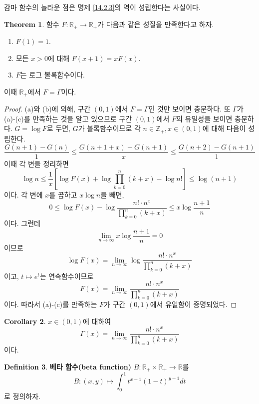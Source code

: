 \documentclass[11pt]{book}
\numberwithin{equation}{chapter}
\def\ZZ{\mathbb{Z}}
\def\RR{\mathbb{R}}
\newcommand{\sqbracket}[1]{\left[#1\right]}
\theoremstyle{definition}
\newtheorem{thm}{Theorem}[section]
\newtheorem{cor}[thm]{Corollary}
\newtheorem{defn}[thm]{Definition}
\newenvironment{enum}
	{\begin{enumerate}[label=(\alph*), leftmargin=2\parindent]}
	{\end{enumerate}}
\begin{document}
감마 함수의 놀라운 점은 명제 \ref{14.2.3}의 역이 성립한다는 사실이다.

\begin{thm} \label{14.2.5}
    함수 \(F : \RR_+ \to \RR_+\)가 다음과 같은 성질을 만족한다고 하자.
    \begin{enum}
        \item \(F(1) = 1\).
        \item 모든 \(x > 0\)에 대해 \(F(x+1) = xF(x)\).
        \item \(F\)는 로그 볼록함수이다.
    \end{enum}
    이때 \(\RR_+\)에서 \(F = \Gamma\)이다.
\end{thm}
\begin{proof}
    (a)와 (b)에 의해, 구간 \((0, 1)\)에서 \(F = \Gamma\)인 것만 보이면 충분하다. 또 \(\Gamma\)가 (a)-(c)를 만족하는 것을 알고 있으므로 구간 \((0, 1)\)에서 \(F\)의 유일성을 보이면 충분하다. \(G = \log F\)로 두면, \(G\)가 볼록함수이므로 각 \(n \in \ZZ_+, x \in (0, 1)\)에 대해 다음이 성립한다.
    \[
    \frac{G(n+1) - G(n)}{1} \le \frac{G(n+1+x) - G(n+1)}{x} \le \frac{G(n+2)-G(n+1)}{1}
    \]
    이때 각 변을 정리하면
    \[
    \log n \le \frac{1}{x}\sqbracket{\log F(x) + \log \prod_{k=0}^n (k+x) - \log n!} \le \log (n+1)    
    \]
    이다. 각 변에 \(x\)를 곱하고 \(x \log n\)을 빼면,
    \[
    0 \le \log F(x) - \log \frac{n! \cdot n^x}{\prod_{k=0}^n (k+x)} \le x \log \frac{n+1}{n}
    \]
    이다. 그런데
    \[
    \lim_{n \to \infty} x \log \frac{n+1}{n}= 0
    \]
    이므로
    \[
    \log F(x) =  \lim_{n \to \infty} \log \frac{n! \cdot n^x}{\prod_{k=0}^n (k+x)}  
    \]
    이고, \(t \mapsto e^t\)는 연속함수이므로
    \[
    F(x) = \lim_{n \to \infty} \frac{n! \cdot n^x}{\prod_{k=0}^n (k+x)}       
    \]
    이다. 따라서 (a)-(c)를 만족하는 \(F\)가 구간 \((0, 1)\)에서 유일함이 증명되었다.
\end{proof}

\begin{cor}
    \(x \in (0, 1)\)에 대하여
    \[
    \Gamma(x) =   \lim_{n \to \infty} \frac{n! \cdot n^x}{\prod_{k=0}^n (k+x)}      
    \]
    이다.
\end{cor}

\begin{defn}
    \textbf{베타 함수(beta function)} \(B : \RR_+ \times \RR_+ \to \RR\)를
    \[
    B : (x, y) \mapsto \int_0^1 t^{x-1} (1-t)^{y-1} dt    
    \]
    로 정의하자.
\end{defn}
\end{document}
